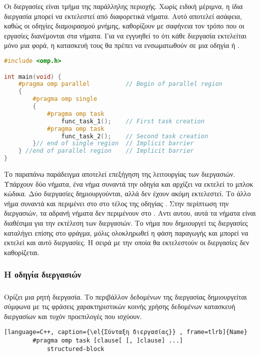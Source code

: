 Οι διεργασίες είναι τμήμα της παράλληλης περιοχής.
Χωρίς ειδική μέριμνα, η ίδια διεργασία μπορεί να εκτελεστεί από διαφορετικά νήματα. Αυτό αποτελεί ασάφεια, καθώς οι οδηγίες διαμοιρασμού μνήμης, καθορίζουν με σαφήνεια τον τρόπο που οι εργασίες διανέμονται στα νήματα. Για να εγγυηθεί το  ότι κάθε διεργασία εκτελείται μόνο μια φορά, η κατασκευή τους θα πρέπει να ενσωματωθούν σε μια οδηγία \emph{} ή \emph{}.

		\begin{lstlisting}[tabsize=4, basicstyle=\small, language=C++, caption={\el{Παράδειγμα κώδικα με διεργασίες}}, frame=tb]
#include <omp.h>

int main(void) {	
	#pragma omp parallel          // Begin of parallel region
	{
		#pragma omp single
		{
			#pragma omp task
				func_task_1();    // First task creation
			#pragma omp task
				func_task_2();    // Second task creation
		}// end of single region  // Implicit barrier
	} //end of parallel region    // Implicit barrier
}
\end{lstlisting}
\clearpage
Το παραπάνω παράδειγμα αποτελεί επεξήγηση της λειτουργίας των διεργασιών. Υπάρχουν δύο νήματα, ένα νήμα συναντά την οδηγία \emph{} και αρχίζει να εκτελεί το μπλοκ κώδικα. Δύο διεργασίες δημιουργούνται, αλλά δεν έχουν ακόμη εκτελεστεί. Tο άλλο νήμα συναντά και περιμένει στο  \emph{} στο τέλος της οδηγίας \emph{}. Στην περίπτωση την διεργασιών, τα αδρανή νήματα δεν περιμένουν στο \emph{}. Αντι αυτου, αυτά τα νήματα είναι διαθέσιμα για την εκτέλεση των διεργασιών. Το νήμα που δημιουργεί τις διεργασίες καταλήγει επίσης στο φράγμα, μόλις ολοκληρωθεί η φάση παραγωγής και μπορεί να εκτελεί και αυτό διεργασίες. Η σειρά με την οποία θα εκτελεστούν οι διεργασίες δεν καθορίζεται.

\subsubsection{Η οδηγία διεργασιών}
\subparagraph{}
	Ορίζει μια ρητή διεργασία. Το περιβάλλον δεδομένων της διεργασίας δημιουργείται σύμφωνα με τις φράσεις χαρακτηριστικών κοινής χρήσης δεδομένων κατασκευή διεργασίων και τυχόν προεπιλογές που ισχύουν\cite{thenextstep20}.
	
\begin{lstlisting}[language=C++, caption={\el{Σύνταξη διεργασίας}} , frame=tlrb]{Name}
		#pragma omp task [clause[ [, ]clause] ...] 
			structured-block 
\end{lstlisting}

